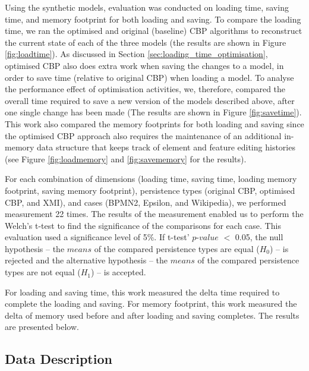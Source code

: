 {Using the synthetic models, evaluation was conducted on loading time, saving time, and memory footprint for both loading and saving. To compare the loading time, we ran the optimised and original (baseline) CBP algorithms to reconstruct the current state of each of the three models (the results are shown in Figure \ref{fig:loadtime}). As discussed in Section \ref{sec:loading_time_optimisation}, optimised CBP also does extra work when saving the changes to a model, in order to save time (relative to original CBP) when loading a model. To analyse the performance effect of optimisation activities, we, therefore, compared the overall time required to save a new version of the models described above, after one single change has been made (The results are shown in Figure \ref{fig:savetime}). This work also compared the memory footprints for both loading and saving since the optimised CBP approach also requires the maintenance of an additional in-memory data structure that keeps track of element and feature editing histories (see Figure \ref{fig:loadmemory} and \ref{fig:savememory} for the results). 

For each combination of dimensions (loading time, saving time, loading memory footprint, saving memory footprint),  persistence types (original CBP, optimised CBP, and XMI), and cases (BPMN2, Epsilon, and Wikipedia), we performed measurement 22 times. The results of the measurement enabled us to perform the Welch's t-test \cite{welch1947ttest} to find the significance of the comparisons for each case. This evaluation used a significance level of 5\%. If t-test' $p$-$value$ $<$ 0.05, the null hypothesis -- the $means$ of the compared persistence types are equal ($H_0$) -- is rejected and the alternative hypothesis -- the $means$ of the compared persistence types are not equal ($H_1$) -- is accepted.

For loading and saving time, this work measured the delta time required to complete the loading and saving. For memory footprint, this work measured the delta of memory used before and after loading and saving completes. The results are presented below.

\subsection{Data Description}
\label{subsec:data_description}

}
